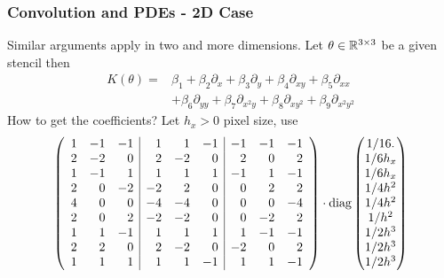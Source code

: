\documentclass[12pt,fleqn,handout]{beamer}
\begin{document}
\begin{frame}
	\frametitle{Convolution and PDEs - 2D Case}
	
	Similar arguments apply in two and more dimensions. Let $\theta\in\mathbb{R}^{3\times 3}$ be a given stencil then
	\begin{align*}
		K(\theta) =&  \beta_1  + \beta_2 \partial_x + \beta_3 \partial_y + \beta_4 \partial_{xy} + \beta_5 \partial_{xx} \\
		& + \beta_6 \partial_{yy} + \beta_7 \partial_{x^2y} + \beta_8 \partial_{xy^2} + \beta_9 \partial_{x^2y^2}
	\end{align*}
	How to get the coefficients? Let $h_x>0$ pixel size, use 
	$$
		\left(
		\begin{array}{rrr|rrr|rrr}
			1 & -1 & -1 &  1 &  1 & -1 & -1 & -1 & -1\\ 
			2 & -2 &  0 &  2 & -2 &  0 &  2 &  0 &  2\\ 
			1 & -1 &  1 &  1 &  1 &  1 & -1 &  1 & -1\\ 
			2 &  0 & -2 & -2 &  2 &  0 &  0 &  2 &  2\\ 
			4 &  0 &  0 & -4 & -4 &  0 &  0 &  0 & -4\\ 
			2 &  0 &  2 & -2 & -2 &  0 &  0 & -2 &  2\\ 
			1 &  1 & -1 &  1 &  1 &  1 &  1 & -1 & -1\\ 
			2 &  2 &  0 &  2 & -2 &  0 & -2 &  0 &  2\\ 
			1 &  1 &  1 &  1 &  1 & -1 &  1 &  1 & -1\\ 
		\end{array}
		\right)
		\cdot {\rm diag}
		\begin{pmatrix}
			1/16.  \\
			1/6h_x \\
			1/6h_x \\
			1/4h^2 \\
			1/4h^2 \\
			1/h^2  \\
			1/2h^3 \\
			1/2h^3 \\
			1/2h^3
		\end{pmatrix}
	$$
	
\end{frame}
\end{document}
